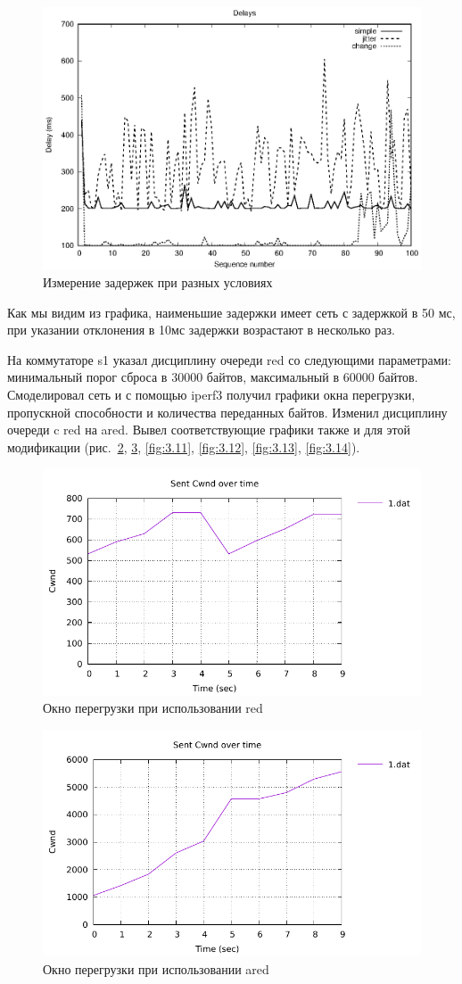 \begin{figure}[!ht]
  \centering
  \includegraphics[width=0.6\linewidth]{image/pings.eps}
  \caption{Измерение задержек при разных условиях}
  \label{fig:3.8}
\end{figure}

Как мы видим из графика, наименьшие задержки имеет сеть с задержкой в 50 мс, при указании отклонения в 10мс задержки возрастают в несколько раз.


На коммутаторе s1 указал дисциплину очереди red со следующими параметрами: минимальный порог сброса в 30000 байтов, максимальный в 60000 байтов.
Смоделировал сеть и с помощью iperf3 получил графики окна перегрузки, пропускной способности и количества переданных байтов. Изменил дисциплину очереди c red на ared. Вывел соответствующие графики также и для этой модификации (рис.~\ref{fig:3.9}, \ref{fig:3.10}, \ref{fig:3.11}, \ref{fig:3.12}, \ref{fig:3.13}, \ref{fig:3.14}).

\begin{figure}[!ht]
  \centering
  \includegraphics[width=0.6\linewidth]{image/red/cwnd_red.pdf}
  \caption{Окно перегрузки при использовании red}
  \label{fig:3.9}
\end{figure}

\begin{figure}[!ht]
  \centering
  \includegraphics[width=0.6\linewidth]{image/ared/cwnd_ared.pdf}
  \caption{Окно перегрузки при использовании ared}
  \label{fig:3.10}
\end{figure}

